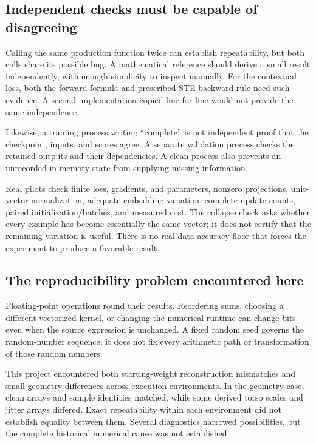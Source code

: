 \subsection{Independent checks must be capable of disagreeing}
Calling the same production function twice can establish repeatability, but
both calls share its possible bug. A mathematical reference should derive a
small result independently, with enough simplicity to inspect manually.
For the contextual loss, both the forward formula and prescribed STE backward
rule need such evidence. A second implementation copied line for line would
not provide the same independence.

Likewise, a training process writing ``complete'' is not independent proof that
the checkpoint, inputs, and scores agree. A separate validation process checks
the retained outputs and their dependencies. A clean process also prevents an
unrecorded in-memory state from supplying missing information.

Real pilots check finite loss, gradients, and parameters, nonzero projections,
unit-vector normalization, adequate embedding variation, complete update counts,
paired initialization/batches, and measured cost. The collapse check asks whether
every example has become essentially the same vector; it does not certify that
the remaining variation is useful. There is no real-data accuracy floor that
forces the experiment to produce a favorable result.

\subsection{The reproducibility problem encountered here}
Floating-point operations round their results. Reordering sums, choosing a
different vectorized kernel, or changing the numerical runtime can change bits
even when the source expression is unchanged. A fixed random seed governs the
random-number sequence; it does not fix every arithmetic path or transformation
of those random numbers.

This project encountered both starting-weight reconstruction mismatches and
small geometry differences across execution environments. In the geometry case,
clean arrays and sample identities matched, while some derived torso scales
and jitter arrays differed. Exact repeatability within each environment did not
establish equality between them. Several diagnostics narrowed possibilities,
but the complete historical numerical cause was not established.

